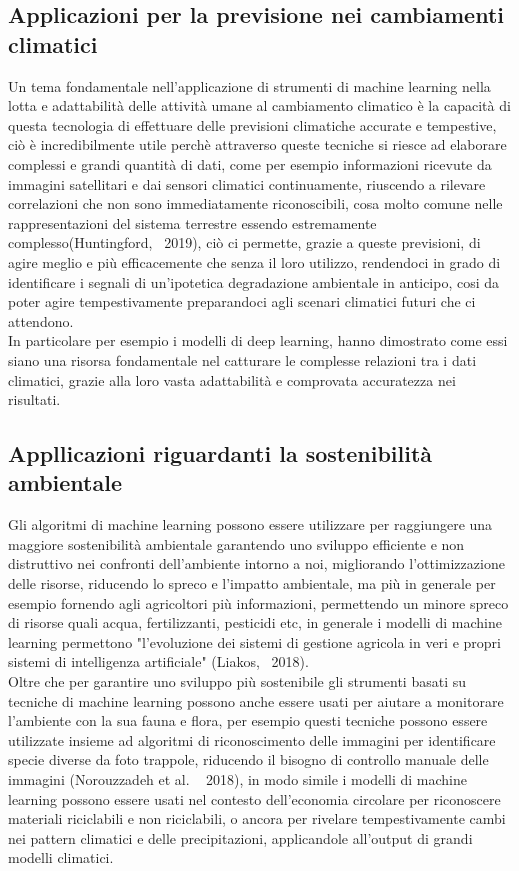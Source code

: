 \subsection{Applicazioni per la previsione nei cambiamenti climatici}
Un tema fondamentale nell'applicazione di strumenti di machine learning nella lotta e adattabilità delle attività umane al cambiamento climatico è la capacità di questa tecnologia di effettuare delle previsioni climatiche accurate e tempestive, ciò è incredibilmente utile perchè attraverso queste tecniche si riesce ad elaborare complessi e grandi quantità di dati, come per esempio informazioni ricevute da immagini satellitari e dai sensori climatici continuamente, riuscendo a rilevare correlazioni che non sono immediatamente riconoscibili, cosa molto comune nelle rappresentazioni del sistema terrestre essendo estremamente complesso(Huntingford,~\cite{huntingford2019machine} 2019), ciò ci permette, grazie a queste previsioni, di agire meglio e più efficacemente che senza il loro utilizzo, rendendoci in grado di identificare i segnali di un'ipotetica degradazione ambientale in anticipo, cosi da poter agire tempestivamente preparandoci agli scenari climatici futuri che ci attendono.\\
In particolare per esempio i modelli di deep learning, hanno dimostrato come essi siano una risorsa fondamentale nel catturare le complesse relazioni tra i dati climatici, grazie alla loro vasta adattabilità e comprovata accuratezza nei risultati.\\

\subsection{Appllicazioni riguardanti la sostenibilità ambientale}
Gli algoritmi di machine learning possono essere utilizzare per raggiungere una maggiore sostenibilità ambientale garantendo uno sviluppo efficiente e non distruttivo nei confronti dell'ambiente intorno a noi, migliorando l'ottimizzazione delle risorse, riducendo lo spreco e l'impatto ambientale, ma più in generale per esempio fornendo agli agricoltori più informazioni, permettendo un minore spreco di risorse quali acqua, fertilizzanti, pesticidi etc, in generale i modelli di machine learning permettono "l'evoluzione dei sistemi di gestione agricola in veri e propri sistemi di intelligenza artificiale" (Liakos,~\cite{liakos2018machine} 2018).\\
Oltre che per garantire uno sviluppo più sostenibile gli strumenti basati su tecniche di machine learning possono anche essere usati per aiutare a monitorare l'ambiente con la sua fauna e flora, per esempio questi tecniche possono essere utilizzate insieme ad algoritmi di riconoscimento delle immagini per identificare specie diverse da foto trappole, riducendo il bisogno di controllo manuale delle immagini (Norouzzadeh et al. ~\cite{norouzzadeh2018automatically} 2018), in modo simile i modelli di machine learning possono essere usati nel contesto dell'economia circolare per riconoscere materiali riciclabili e non riciclabili, o ancora per rivelare tempestivamente cambi nei pattern climatici e delle precipitazioni, applicandole all'output di grandi modelli climatici.\\

